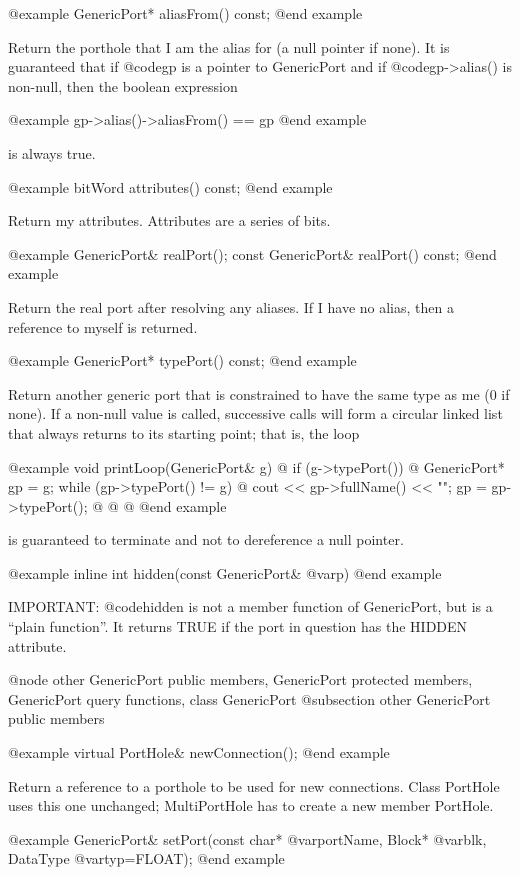 @example
GenericPort* aliasFrom() const;
@end example

Return the porthole that I am the alias for (a null pointer if none).
It is guaranteed that if @code{gp} is a pointer to GenericPort and if
@code{gp->alias()} is non-null, then the boolean expression

@example
gp->alias()->aliasFrom() == gp
@end example

is always true.

@example
bitWord attributes() const;
@end example

Return my attributes.  Attributes are a series of bits.

@example
GenericPort& realPort();
const GenericPort& realPort() const;
@end example

Return the real port after resolving any aliases.  If I have no alias,
then a reference to myself is returned.

@example
GenericPort* typePort() const;
@end example

Return another generic port that is constrained to have the same type as
me (0 if none).  If a non-null value is called, successive calls will
form a circular linked list that always returns to its starting point;
that is, the loop

@example
void printLoop(GenericPort& g) @{
        if (g->typePort()) @{
                GenericPort* gp = g;
                while (gp->typePort() != g) @{
                        cout << gp->fullName() << "\n";
                        gp = gp->typePort();
                @}
        @}
@}
@end example

is guaranteed to terminate and not to dereference a null pointer.

@example
inline int hidden(const GenericPort& @var{p})
@end example

IMPORTANT: @code{hidden} is not a member function of GenericPort,
but is a ``plain function''.  It returns TRUE if the port in question
has the HIDDEN attribute.

@node other GenericPort public members, GenericPort protected members, GenericPort query functions, class GenericPort
@subsection other GenericPort public members

@example
virtual PortHole& newConnection();
@end example

Return a reference to a porthole to be used for new connections.
Class PortHole uses this one unchanged; MultiPortHole has to create
a new member PortHole.

@example
GenericPort& setPort(const char* @var{portName}, Block* @var{blk}, DataType @var{typ}=FLOAT);
@end example

